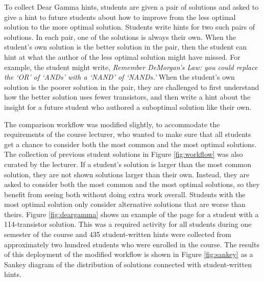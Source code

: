 To collect Dear Gamma hints, students are given a pair of solutions and asked to give a hint to future students about how to improve from the less optimal solution to the more optimal solution. Students write hints for two such pairs of solutions. In each pair, one of the solutions is always their own. When the student's own solution is the better solution in the pair, then the student can hint at what the author of the less optimal solution might have missed. For example, the student might write, {\it Remember DeMorgan's Law: you could replace the `OR' of `ANDs' with a `NAND' of `NANDs.'} When the student's own solution is the poorer solution in the pair, they are challenged to first understand how the better solution uses fewer transistors, and then write a hint about the insight for a future student who authored a suboptimal solution like their own. 

The comparison workflow was modified slightly, to accommodate the requirements of the course lecturer, who wanted to make sure that all students get a chance to consider both the most common and the most optimal solutions. The collection of previous student solutions in Figure \ref{fig:workflow} was also curated by the lecturer. If a student's solution is larger than the most common solution, they are not shown solutions larger than their own. Instead, they are asked to consider both the most common and the most optimal solutions, so they benefit from seeing both without doing extra work overall. Students with the most optimal solution only consider alternative solutions that are worse than theirs. Figure \ref{fig:deargamma} shows an example of the page for a student with a 114-transistor solution. This was a required activity for all students during one semester of the course and 435 student-written hints were collected from approximately two hundred students who were enrolled in the course. The results of this deployment of the modified workflow is shown in Figure \ref{fig:sankey} as a Sankey diagram of the distribution of solutions connected with student-written hints. %





